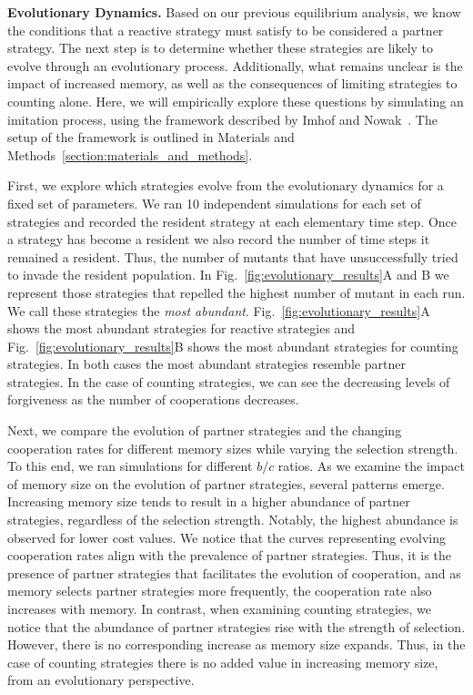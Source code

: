 \documentclass{article}
\theoremstyle{definition}
\begin{document}
\textbf{Evolutionary Dynamics.}
Based on our previous equilibrium analysis, we know the conditions that a
reactive strategy must satisfy to be considered a partner strategy. The next
step is to determine whether these strategies are likely to evolve through an
evolutionary process. Additionally, what remains unclear is the impact of
increased memory, as well as the consequences of limiting strategies to counting
alone. Here, we will empirically explore these questions by simulating an
imitation process, using the framework described by Imhof and
Nowak~\cite{imhof:royal:2010}. The setup of the framework is outlined in
Materials and Methods~\ref{section:materials_and_methods}.

First, we explore which strategies evolve from the evolutionary dynamics for a
fixed set of parameters. We ran 10 independent simulations for each set of
strategies and recorded the resident strategy at each elementary time step. Once
a strategy has become a resident we also record the number of time steps it
remained a resident. Thus, the number of mutants that have unsuccessfully tried
to invade the resident population. In Fig.~\ref{fig:evolutionary_results}A and B
we represent those strategies that repelled the highest number of mutant in each
run. We call these strategies the {\it most abundant}.
Fig.~\ref{fig:evolutionary_results}A shows the most abundant strategies for
reactive strategies and Fig.~\ref{fig:evolutionary_results}B shows the most
abundant strategies for counting strategies. In both cases the most abundant
strategies resemble partner strategies. In the case of counting strategies, we
can see the decreasing levels of forgiveness as the number of cooperations
decreases.

Next, we compare the evolution of partner strategies and the changing
cooperation rates for different memory sizes while varying the selection
strength. To this end, we ran simulations for different $b/c$ ratios.
As we examine the impact of memory size on the evolution of partner
strategies, several patterns emerge. Increasing memory size tends to result
in a higher abundance of partner strategies, regardless of the selection
strength. Notably, the highest abundance is observed for lower cost values. We
notice that the curves representing evolving cooperation rates align with the
prevalence of partner strategies. Thus, it is the presence of partner strategies
that facilitates the evolution of cooperation, and as memory selects partner
strategies more frequently, the cooperation rate also increases with memory.
In contrast, when examining
counting strategies, we notice that the abundance of partner strategies rise
with the strength of selection. However, there is no corresponding increase as
memory size expands. Thus, in the case of counting strategies there is no added
value in increasing memory size, from an evolutionary perspective.
\end{document}
